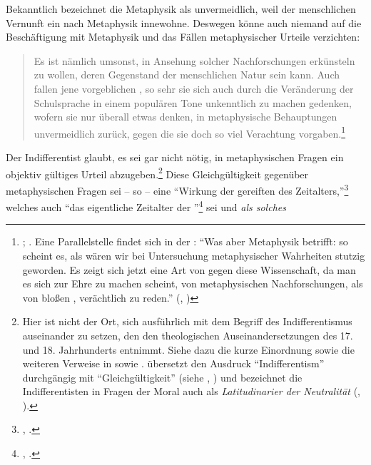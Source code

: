 Bekanntlich bezeichnet  die Metaphysik als
unvermeidlich, weil der menschlichen Vernunft ein  nach
Metaphysik innewohne. Deswegen könne auch niemand auf die Beschäftigung mit
Metaphysik und das Fällen metaphysischer Urteile verzichten:
\begin{quote}
Es ist nämlich umsonst,  in Ansehung solcher
Nachforschungen erkünsteln zu wollen, deren Gegenstand der menschlichen Natur
 sein kann. Auch fallen jene vorgeblichen
,
so sehr sie sich auch durch die Veränderung der Schulsprache in einem populären Tone unkenntlich zu machen gedenken, wofern sie
nur überall etwas denken, in metaphysische Behauptungen unvermeidlich zurück,
gegen die sie doch so viel Verachtung
vorgaben.\footnote{\cite[][A~x]{Kant:KritikderreinenVernunft2003};
\cite[][IV: 8.28--34]{Kant:GesammelteWerke1900ff.}. Eine Parallelstelle findet
sich in der : \enquote{Was aber Metaphysik betrifft: so scheint
es, als wären wir bei Untersuchung metaphysischer Wahrheiten stutzig geworden.
Es zeigt sich jetzt eine Art von  gegen diese
Wissenschaft, da man es sich zur Ehre zu machen scheint, von metaphysischen
Nachforschungen, als von bloßen , verächtlich zu reden.}
\mkbibparens{\cite[][A 39]{Kant:ImmanuelKantsLogik1977},
\cite[][IX: 32.31--36]{Kant:GesammelteWerke1900ff.}}}
\end{quote}
Der Indifferentist glaubt, es sei gar nicht nötig, in metaphysischen Fragen ein
objektiv gültiges Urteil abzugeben.\footnote{Hier ist nicht der Ort, sich
ausführlich mit dem Begriff des Indifferentismus auseinander zu setzen, den
 den theologischen Auseinandersetzungen des 17. und 18.
Jahrhunderts entnimmt. Siehe dazu die kurze Einordnung sowie die weiteren
Verweise in \cite[][\pno~511\,f.,]{Gierl:PietismusundAufklaerung1997} sowie
\cite[][\pno~513\,f.]{Albrecht:Eklektik1994}.  übersetzt
den Ausdruck \enquote{Indifferentism} durchgängig mit
\enquote{Gleichgültigkeit} \mkbibparens{siehe
\cite[][A 96]{Kant:BeobachtungenueberdasGefuehldesSchoenenundErhabenen1977},
\cite[][II: 250.11]{Kant:GesammelteWerke1900ff.}} und bezeichnet die
Indifferentisten in Fragen der Moral auch als \emph{Latitudinarier
der Neutralität} \mkbibparens{\cite[][B
9]{Kant:DieReligioninnerhalbderGrenzenderblossenVernunft1977}, \cite[][VI:
22.19--28]{Kant:GesammelteWerke1900ff.}}.} Diese Gleichgültigkeit gegenüber
metaphysischen Fragen sei -- so  -- eine \enquote{Wirkung
{\punkt} der gereiften  des Zeitalters,}\footnote{\cite[][A
xi]{Kant:KritikderreinenVernunft2003}, \cite[][IV:
9.2--3]{Kant:GesammelteWerke1900ff.}.} welches auch \enquote{das eigentliche
Zeitalter der }\footnote{\cite[][A
xi]{Kant:KritikderreinenVernunft2003}, \cite[][IV:
9.33]{Kant:GesammelteWerke1900ff.}.} sei und \emph{als solches}
